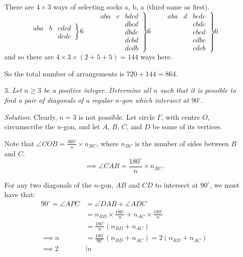\documentclass{article}
\begin{document}
\begin{enumerate}[1.]
There are $4 \times 3$ ways of selecting socks a, b, a (third same as first).
$$
\left. \begin{matrix}
  aba & b & cdcd \\
  & & dcdc
\end{matrix} \right\} 6
\qquad
\left. \begin{matrix}
  aba & c & bdcd \\
  & & dbcd \\
  & & dbdc \\
  & & dcbd \\
  & & dcdb
\end{matrix} \right\} 6
\qquad
\left. \begin{matrix}
  aba & d & bcdc \\
  & & cbdc \\
  & & cbcd \\
  & & cdbc \\
  & & cdcb
\end{matrix} \right\} 6
$$
and so there are $4 \times 3 \times (2 + 5 + 5) = 144$ ways here.

So the total number of arrangements is $720 + 144 = 864$.


\item[3.] %
\textit{Let $n\geq3$ be a positive integer.
Determine all $n$ such that it is possible to find a pair of diagonals of a regular $n$-gon which intersect at $90^\circ$.}

\textit{Solution}:
Clearly, $n = 3$ is not possible. Let circle $\Gamma$, with centre $O$, circumscribe the $n$-gon, and let $A$, $B$, $C$, and $D$ be some of its vertices.

Note that $\angle COB = \frac{360^\circ}{n} \times n_{BC}$, where $n_{BC}$ is the number of sides between $B$ and $C$.
$$ \implies \angle CAB = \frac{180^\circ}{n} \times n_{BC}. $$

For any two diagonals of the $n$-gon, $AB$ and $CD$ to intersect at $90^\circ$, we must have that:
\begin{align*}
  90^\circ = \angle APC & = \angle DAB + \angle ADC \\
  & = n_{BD} \times \frac{180^\circ}{n} + n_{AC} \times \frac{180^\circ}{n} \\
  & = \frac{180^\circ}{n} (n_{BD} + n_{AC}) \\
  \implies n & = \frac{180^\circ}{90^\circ} (n_{BD} + n_{AC}) = 2 (n_{BD} + n_{AC}) \\
  \implies 2 & \mid n
\end{align*}


\end{enumerate}
\end{document}
